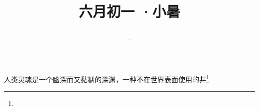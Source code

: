 \title{\date[d=6,m=7,y=2024][year:cn-y,年,month:cn,day:cn,日,·,weekday]·六月初一 ·小暑}
人类灵魂是一个幽深而又黏稠的深渊，一种不在世界表面使用的井\footnote{ }

